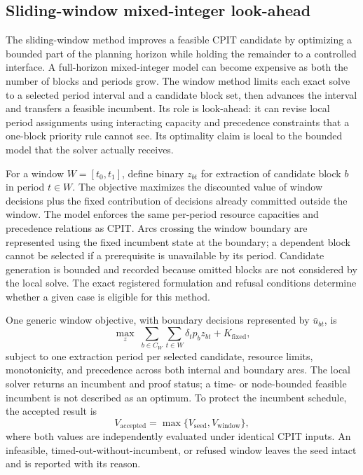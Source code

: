 \subsection{Sliding-window mixed-integer look-ahead}
\label{sec:method-sliding}
The sliding-window method improves a feasible CPIT candidate by optimizing a bounded part of the planning horizon while holding the remainder to a controlled interface. A full-horizon mixed-integer model can become expensive as both the number of blocks and periods grow. The window method limits each exact solve to a selected period interval and a candidate block set, then advances the interval and transfers a feasible incumbent. Its role is look-ahead: it can revise local period assignments using interacting capacity and precedence constraints that a one-block priority rule cannot see. Its optimality claim is local to the bounded model that the solver actually receives.

For a window $W=[t_0,t_1]$, define binary $z_{bt}$ for extraction of candidate block $b$ in period $t\in W$. The objective maximizes the discounted value of window decisions plus the fixed contribution of decisions already committed outside the window. The model enforces the same per-period resource capacities and precedence relations as CPIT. Arcs crossing the window boundary are represented using the fixed incumbent state at the boundary; a dependent block cannot be selected if a prerequisite is unavailable by its period. Candidate generation is bounded and recorded because omitted blocks are not considered by the local solve. The exact registered formulation and refusal conditions determine whether a given case is eligible for this method.

One generic window objective, with boundary decisions represented by $\bar u_{bt}$, is
\begin{equation}
 \max_{z}\;\sum_{b\in C_W}\sum_{t\in W}\delta_t p_b z_{bt}+K_{\mathrm{fixed}},
\end{equation}
subject to one extraction period per selected candidate, resource limits, monotonicity, and precedence across both internal and boundary arcs. The local solver returns an incumbent and proof status; a time- or node-bounded feasible incumbent is not described as an optimum. To protect the incumbent schedule, the accepted result is
\begin{equation}
 V_{\mathrm{accepted}}=\max\{V_{\mathrm{seed}},V_{\mathrm{window}}\},
\end{equation}
where both values are independently evaluated under identical CPIT inputs. An infeasible, timed-out-without-incumbent, or refused window leaves the seed intact and is reported with its reason.


